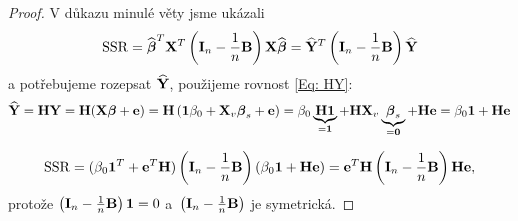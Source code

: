 \begin{proof}
V důkazu minulé věty jsme ukázali
 $$
\SSR = \wbetab^T \X^T \left(\Identita{n} - \lomn{1} \Bm \right) \X \wbetab = \hYb^T \left(\Identita{n} - \lomn{1} \Bm \right) \hYb
 $$
a potřebujeme rozepsat $\hYb$, použijeme rovnost \eqref{Eq: HY}:
 $$
\hYb = \Hm \Y = \Hm (\X \betab + \eb) = \Hm \left( \jednab \beta_0 + \X_v \betab_s + \eb \right) = \beta_0 \underbrace{\Hm \jednab}_{= \jednab} + \Hm \X_v \underbrace{\betab_s}_{= \nula} + \Hm \eb = \beta_0 \jednab + \Hm \eb
 $$

 $$
\SSR = (\beta_0 \jednab^T + \eb^T \Hm)\left(\Identita{n} - \lomn{1} \Bm \right) (\beta_0 \jednab + \Hm \eb) = \eb^T \Hm \left(\Identita{n} - \lomn{1} \Bm \right) \Hm \eb,
 $$
protože $\left(\Identita{n} - \lomn{1} \Bm \right) \jednab = 0$ a~$\left(\Identita{n} - \lomn{1} \Bm \right)$ je symetrická.


\end{proof}

